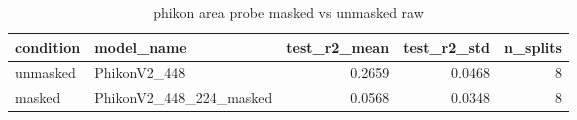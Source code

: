 \begin{table}
\caption{phikon area probe masked vs unmasked raw}
\label{tab:phikon_area_probe_masked_vs_unmasked_raw}
\begin{tabular}{llrrr}
\toprule
condition & model_name & test_r2_mean & test_r2_std & n_splits \\
\midrule
unmasked & PhikonV2_448 & 0.2659 & 0.0468 & 8 \\
masked & PhikonV2_448_224_masked & 0.0568 & 0.0348 & 8 \\
\bottomrule
\end{tabular}
\end{table}
